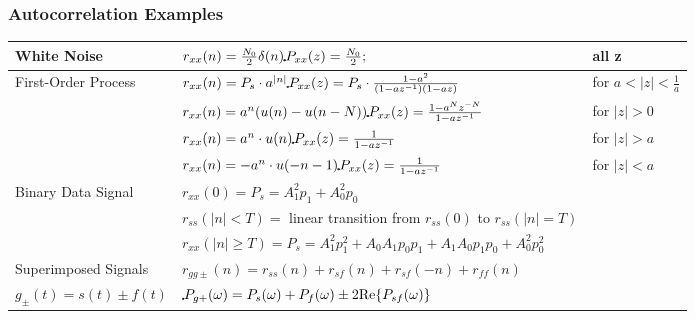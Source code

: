 		\subsubsection{Autocorrelation Examples}
		\begin{tabular}{|l|l|l|}
			\hline
				White Noise
				& $r_{xx} (n) = \frac {N_0}{2} \delta(n) \FT P_{xx}(z)= \frac {N_0}{2};\hspace{0.25cm}$ & all z\\
			\hline
				First-Order Process
				& $r_{xx} (n) = P_s \cdot a^{|n|} \FT P_{xx} (z) = P_s \cdot \frac {1-a^2}{(1-az^{-1})(1-az)}$ & for $a<|z| < \frac{1}{a}$\\
			\hline
				
				& $r_{xx} (n) = a^n(u(n) - u(n-N)) \FT P_{xx} (z) = \frac{1-a^Nz^{-N}}{1-az^{-1}}$ & for $|z| > 0$\\
			\hline
				
				& $r_{xx} (n) = a^n \cdot u(n) \FT P_{xx} (z) = \frac{1}{1-az^{-1}}$ & for $|z| > a$\\
			\hline
				
				& $r_{xx} (n) = -a^n \cdot u(-n-1) \FT P_{xx} (z) = \frac{1}{1-az^{-1}}$ & for $|z| < a$\\
			\hline
				Binary Data Signal
				& $r_{xx} (0) = P_s = A_1^2p_1 + A_0^2 p_0 $ &\\
				&$r_{ss} (|n| < T) = $ linear transition from $r_{ss}(0)$ to $r_{ss} (|n| = T)$ &\\
				& $r_{xx} (|n| \geq T) = P_s = A_1^2p_1^2 + A_0A_1p_0p_1 + A_1A_0p_1p_0 + A_0^2p_0^2$ &  \\
			\hline
				Superimposed Signals
				& $r_{gg\pm}(n) = r_{ss}(n) + r_{sf}(n) + r_{sf}(-n) + r_{ff}(n) $ &\\
				$g_\pm(t) = s(t) \pm f(t)$
				&  $\FT P_{g+}(\omega) = P_{s}(\omega) + P_{f}(\omega) \pm 2 \text{Re} \{P_{sf}(\omega) \}$ &\\ 
			\hline
		\end{tabular} 
		\vspace{-0.5cm}

